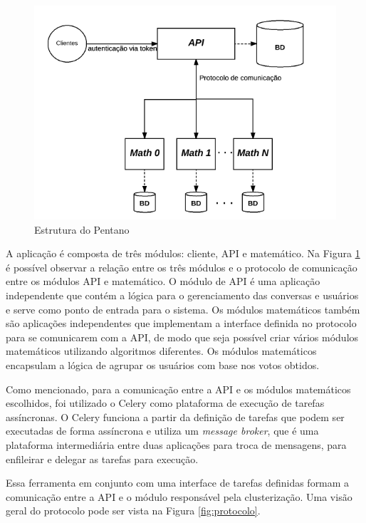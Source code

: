     \begin{figure}[h!]
    \centering
    \includegraphics[scale=0.7]{figuras/esquema_pentano.png}
    \caption{Estrutura do Pentano}
    \label{fig:pentano}
    \end{figure}
    
    A aplicação é composta de três módulos: cliente, API e matemático. Na Figura \ref{fig:pentano}
    é possível observar a relação entre os três módulos e o protocolo de comunicação entre os módulos API e matemático. O módulo de 
    API é uma aplicação independente que contém a lógica para o gerenciamento das conversas e usuários e
    serve como ponto de entrada para o sistema. Os módulos matemáticos também são aplicações independentes que implementam a 
    interface definida no protocolo
    para se comunicarem com a API, de modo que seja possível criar vários módulos matemáticos utilizando algoritmos diferentes.
    Os módulos matemáticos encapsulam a lógica de agrupar os usuários com base nos votos obtidos.
    
    Como mencionado, para a comunicação entre a API e os módulos matemáticos escolhidos,
    foi utilizado o Celery como plataforma de execução de tarefas assíncronas.
    O Celery funciona a partir da definição de tarefas que podem ser executadas de forma assíncrona
    e utiliza um \textit{message broker}, que é uma plataforma intermediária
    entre duas aplicações para troca de mensagens, para enfileirar e delegar as tarefas para execução.
    
    Essa ferramenta em conjunto com uma interface de tarefas definidas formam
    a comunicação entre a API e o módulo responsável pela clusterização. 
    Uma visão geral do protocolo pode ser vista na Figura \ref{fig:protocolo}.
    

